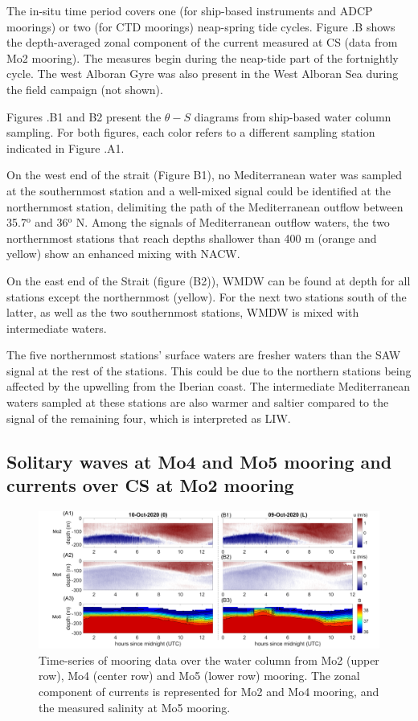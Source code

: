 The in-situ time period covers one (for ship-based instruments and ADCP moorings) or two (for CTD moorings) neap-spring tide cycles. Figure .B shows the depth-averaged zonal component of the current measured at CS (data from Mo2 mooring). The measures begin during the neap-tide part of the fortnightly cycle. The west Alboran Gyre was also present in the West Alboran Sea during the field campaign (not shown). 

Figures .B1 and B2 present the $\theta-S$ diagrams from ship-based water column sampling. For both figures, each color refers to a different sampling station indicated in Figure .A1.

On the west end of the strait (Figure B1), no Mediterranean water was sampled at the southernmost station and a well-mixed signal could be identified at the northernmost station, delimiting the path of the Mediterranean outflow between 35.7$^{\text{o}}$ and 36$^{\text{o}}$ N. Among the signals of Mediterranean outflow waters, the two northernmost stations that reach depths shallower than 400 m (orange and yellow) show an enhanced mixing with NACW.

On the east end of the Strait (figure (B2)), WMDW can be found at depth for all stations except the northernmost (yellow). For the next two stations south of the latter, as well as the two southernmost stations, WMDW is mixed with intermediate waters. 

The five northernmost stations' surface waters are fresher waters than the SAW signal at the rest of the stations. This could be due to the northern stations being affected by the upwelling from the Iberian coast. The intermediate Mediterranean waters sampled at these stations are also warmer and saltier compared to the signal of the remaining four, which is interpreted as LIW.


\subsection{Solitary waves at Mo4 and Mo5 mooring and currents over CS at Mo2 mooring}
\label{section_obs_moor}

\begin{figure}[!h]
 \includegraphics[width=\textwidth]{./GBR3D/US_moorings1.png}
 \caption [Time-series of mooring data from Mo2, Mo4 and Mo5]{Time-series of mooring data over the water column from Mo2 (upper row), Mo4 (center row) and Mo5 (lower row) mooring. The zonal component of currents is represented for Mo2 and Mo4 mooring, and the measured salinity at Mo5 mooring.}
 \label{fig_moor_US1}
\end{figure}


